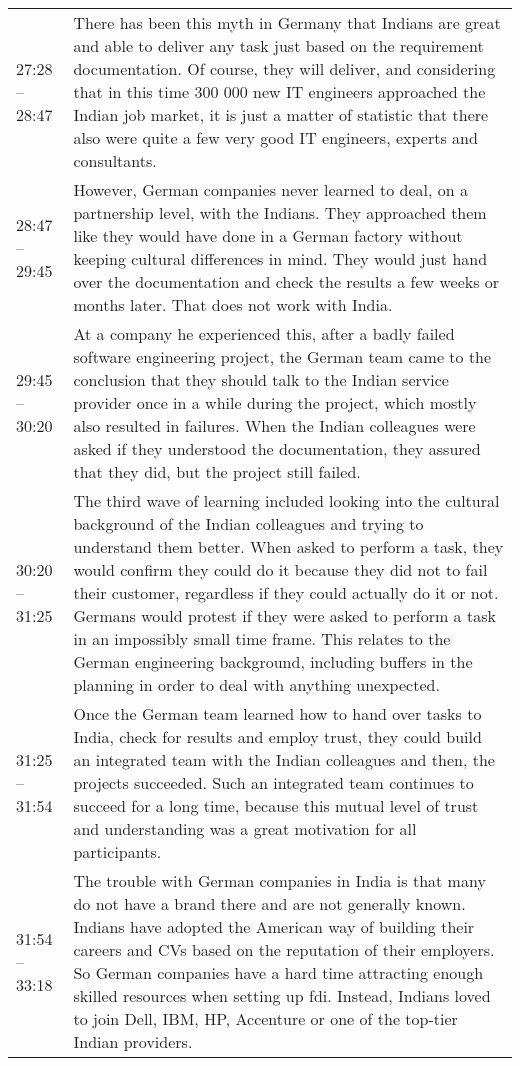 \begin{appendix}
\begin{longtable}{l p{12.5cm}}
	27:28 -- 28:47&There has been this myth in Germany that Indians are great and able to deliver any task just based on the requirement documentation. Of course, they will deliver, and considering that in this time 300 000 new IT engineers approached the Indian job market, it is just a matter of statistic that there also were quite a few very good IT engineers, experts and consultants.\\
	28:47 -- 29:45&However, German companies never learned to deal, on a partnership level, with the Indians. They approached them like they would have done in a German factory without keeping cultural differences in mind. They would just hand over the documentation and check the results a few weeks or months later. That does not work with India.\\
	29:45 -- 30:20 & At a company he experienced this, after a badly failed software engineering project, the German team came to the conclusion that they should talk to the Indian service provider once in a while during the project, which mostly also resulted in failures. When the Indian colleagues were asked if they understood the documentation, they assured that they did, but the project still failed.\\
	30:20 -- 31:25& The third wave of learning included looking into the cultural background of the Indian colleagues and trying to understand them better. When asked to perform a task, they would confirm they could do it because they did not to fail their customer, regardless if they could actually do it or not. Germans would protest if they were asked to perform a task in an impossibly small time frame. This relates to the German engineering background, including buffers in the planning in order to deal with anything unexpected.\\
	31:25 -- 31:54&Once the German team learned how to hand over tasks to India, check for results and employ trust, they could build an integrated team with the Indian colleagues and then, the projects succeeded. Such an integrated team continues to succeed for a long time, because this mutual level of trust and understanding was a great motivation for all participants.\\
	31:54 -- 33:18&The trouble with German companies in India is that many do not have a brand there and are not generally known. Indians have adopted the American way of building their careers and CVs based on the reputation of their employers. So German companies have a hard time attracting enough skilled resources when setting up \gls{fdi}. Instead, Indians loved to join Dell, IBM, HP, Accenture or one of the top-tier Indian providers.\\

\end{longtable}
\end{appendix}
